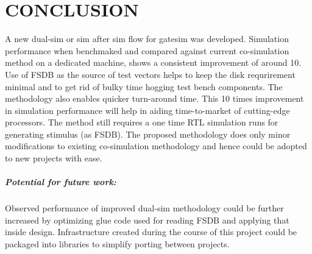 \chapter{CONCLUSION}
\label{chap:conclusion}
A new dual-sim or sim after sim flow for gatesim was developed. Simulation performance when benchmaked and compared against current co-simulation method on a dedicated machine, shows a consistent improvement of around 10. Use of FSDB as the source of test vectors helps to keep the disk requrirement minimal and to get rid of bulky time hogging test bench components. The methodology also enables quicker turn-around time. This 10 times improvement in simulation performance will help in aiding time-to-market of cutting-edge processors. The method still requires a one time RTL simulation runs for generating stimulus (as FSDB). The proposed methodology does only minor modifications to existing co-simulation methodology and hence could be adopted to new projects with ease.
\paragraph{Potential for future work:}Observed performance of improved dual-sim methodology could be further increased by optimizing glue code used for reading FSDB and applying that inside design. Infrastructure created during the course of this project could be packaged into libraries to simplify porting between projects.
